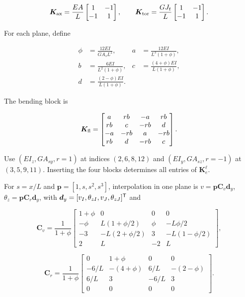 \begin{equation}
\bm K_{\rm ax}=\frac{EA}{L}\begin{bmatrix}1&-1\\-1&1\end{bmatrix},\qquad
\bm K_{\rm tor}=\frac{GJ_t}{L}\begin{bmatrix}1&-1\\-1&1\end{bmatrix}.
\end{equation}

For each plane, define

\begin{align}
\phi&=\frac{12EI}{GA_sL^2},&a&=\frac{12EI}{L^3(1+\phi)},\nonumber\\
b&=\frac{6EI}{L^2(1+\phi)},&c&=\frac{(4+\phi)EI}{L(1+\phi)},\nonumber\\
d&=\frac{(2-\phi)EI}{L(1+\phi)}.
\end{align}

The bending block is

\begin{equation}
\bm K_{\rm fl}=\begin{bmatrix}
a&rb&-a&rb\\rb&c&-rb&d\\-a&-rb&a&-rb\\rb&d&-rb&c
\end{bmatrix}.
\end{equation}

Use $(EI_z,GA_{sy},r=1)$ at indices $(2,6,8,12)$ and $(EI_y,GA_{sz},r=-1)$ at $(3,5,9,11)$. Inserting the four blocks determines all entries of $\bm K_e^\ell$.

For $s=x/L$ and $\bm p=[1,s,s^2,s^3]$, interpolation in one plane is $v=\bm p\bm C_v\bm d_y$, $\theta_z=\bm p\bm C_r\bm d_y$, with $\bm d_y=[v_I,\theta_{zI},v_J,\theta_{zJ}]^\mathsf T$ and

\begin{equation}
\bm C_v=\frac1{1+\phi}\begin{bmatrix}
1+\phi&0&0&0\\
-\phi&L(1+\phi/2)&\phi&-L\phi/2\\
-3&-L(2+\phi/2)&3&-L(1-\phi/2)\\
2&L&-2&L
\end{bmatrix},
\end{equation}

\begin{equation}
\bm C_r=\frac1{1+\phi}\begin{bmatrix}
0&1+\phi&0&0\\
-6/L&-(4+\phi)&6/L&-(2-\phi)\\
6/L&3&-6/L&3\\0&0&0&0
\end{bmatrix}.
\end{equation}

